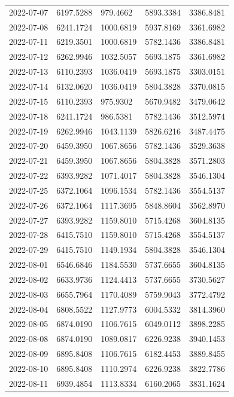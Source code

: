 {\begin{longtable}{lllll}
2022-07-07 & 6197.5288 & 979.4662 & 5893.3384 & 3386.8481 \\
2022-07-08 & 6241.1724 & 1000.6819 & 5937.8169 & 3361.6982 \\
2022-07-11 & 6219.3501 & 1000.6819 & 5782.1436 & 3386.8481 \\
2022-07-12 & 6262.9946 & 1032.5057 & 5693.1875 & 3361.6982 \\
2022-07-13 & 6110.2393 & 1036.0419 & 5693.1875 & 3303.0151 \\
2022-07-14 & 6132.0620 & 1036.0419 & 5804.3828 & 3370.0815 \\
2022-07-15 & 6110.2393 & 975.9302 & 5670.9482 & 3479.0642 \\
2022-07-18 & 6241.1724 & 986.5381 & 5782.1436 & 3512.5974 \\
2022-07-19 & 6262.9946 & 1043.1139 & 5826.6216 & 3487.4475 \\
2022-07-20 & 6459.3950 & 1067.8656 & 5782.1436 & 3529.3638 \\
2022-07-21 & 6459.3950 & 1067.8656 & 5804.3828 & 3571.2803 \\
2022-07-22 & 6393.9282 & 1071.4017 & 5804.3828 & 3546.1304 \\
2022-07-25 & 6372.1064 & 1096.1534 & 5782.1436 & 3554.5137 \\
2022-07-26 & 6372.1064 & 1117.3695 & 5848.8604 & 3562.8970 \\
2022-07-27 & 6393.9282 & 1159.8010 & 5715.4268 & 3604.8135 \\
2022-07-28 & 6415.7510 & 1159.8010 & 5715.4268 & 3554.5137 \\
2022-07-29 & 6415.7510 & 1149.1934 & 5804.3828 & 3546.1304 \\
2022-08-01 & 6546.6846 & 1184.5530 & 5737.6655 & 3604.8135 \\
2022-08-02 & 6633.9736 & 1124.4413 & 5737.6655 & 3730.5627 \\
2022-08-03 & 6655.7964 & 1170.4089 & 5759.9043 & 3772.4792 \\
2022-08-04 & 6808.5522 & 1127.9773 & 6004.5332 & 3814.3960 \\
2022-08-05 & 6874.0190 & 1106.7615 & 6049.0112 & 3898.2285 \\
2022-08-08 & 6874.0190 & 1089.0817 & 6226.9238 & 3940.1453 \\
2022-08-09 & 6895.8408 & 1106.7615 & 6182.4453 & 3889.8455 \\
2022-08-10 & 6895.8408 & 1110.2974 & 6226.9238 & 3822.7786 \\
2022-08-11 & 6939.4854 & 1113.8334 & 6160.2065 & 3831.1624 \\

\end{longtable}}
